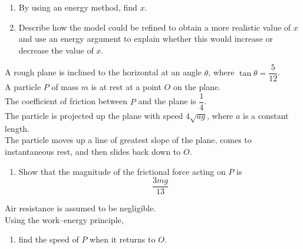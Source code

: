 \documentclass[leqno]{article}
\begin{document}
\begin{enumerate}[
  label=\textbf{\arabic*.},
  leftmargin=*,
  topsep=0pt,
  partopsep=0pt,
  parsep=0pt
]
\begin{enumerate}[label=\textbf{(\alph*)}]
  \item By using an energy method, find $x$.  \\
  \item Describe how the model could be refined to obtain a more realistic value of $x$ and use an energy argument to explain whether this would increase or decrease the value of $x$.  \\
\end{enumerate}

\newpage

\questionitem

A rough plane is inclined to the horizontal at an angle $\theta$, where $\tan\theta=\dfrac{5}{12}$. \\

A particle $P$ of mass $m$ is at rest at a point $O$ on the plane. \\

The coefficient of friction between $P$ and the plane is $\dfrac{1}{4}$. \\

The particle is projected up the plane with speed $4\sqrt{ag}$, where $a$ is a constant length. \\

The particle moves up a line of greatest slope of the plane, comes to instantaneous rest, and then slides back down to $O$. \\

\begin{enumerate}[label=\textbf{(\alph*)}]
  \item Show that the magnitude of the frictional force acting on $P$ is
  \[
  \dfrac{3mg}{13}
  \]
\end{enumerate}
Air resistance is assumed to be negligible. \\

Using the work--energy principle, \\

\begin{enumerate}[label=\textbf{(\alph*)}, resume]
  \item find the speed of $P$ when it returns to $O$.  \\
\end{enumerate}

\newpage

\questionitem
\begin{figure}[H]
    \centering
{}
\end{figure}
\end{enumerate}
\end{document}
